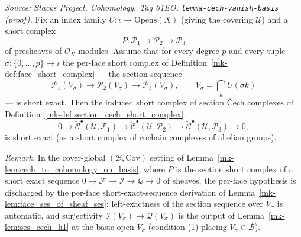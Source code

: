 \begin{lemma}\label{mk-lem:cech_ses_of_basis}
  \leanok

  \textit{Source: Stacks Project, Cohomology, Tag 01EO,
  \texttt{lemma-cech-vanish-basis} (proof).}
  Fix an index family \(U : \iota \to \mathrm{Opens}(X)\) (giving the covering \(\mathcal{U}\)) and a
  short complex
  \[
    P : \mathcal{P}_1 \to \mathcal{P}_2 \to \mathcal{P}_3
  \]
  of presheaves of \(\mathcal{O}_X\)-modules. Assume that for every degree \(p\) and every tuple
  \(\sigma : \{0, \ldots, p\} \to \iota\) the per-face short complex of
  Definition~\ref{mk-def:face_short_complex} — the section sequence
  \[
    \mathcal{P}_1(V_\sigma) \longrightarrow \mathcal{P}_2(V_\sigma) \longrightarrow
      \mathcal{P}_3(V_\sigma), \qquad V_\sigma = \bigcap_k U(\sigma k)
  \]
  — is short exact. Then the induced short complex of section {\v C}ech complexes of
  Definition~\ref{mk-def:section_cech_short_complex},
  \[
    0 \to \check{\mathcal{C}}^\bullet(\mathcal{U}, \mathcal{P}_1) \to
      \check{\mathcal{C}}^\bullet(\mathcal{U}, \mathcal{P}_2) \to
      \check{\mathcal{C}}^\bullet(\mathcal{U}, \mathcal{P}_3) \to 0,
  \]
  is short exact (as a short complex of cochain complexes of abelian groups).

  \emph{Remark.} In the cover-global \((\mathcal{B}, \mathrm{Cov})\) setting of
  Lemma~\ref{mk-lem:cech_to_cohomology_on_basis}, where \(P\) is the section short complex of a short
  exact sequence \(0 \to \mathcal{F} \to \mathcal{I} \to \mathcal{Q} \to 0\) of sheaves, the per-face
  hypothesis is discharged by the per-face short-exact-sequence derivation of
  Lemma~\ref{mk-lem:face_ses_of_sheaf_ses}: left-exactness of the section sequence over \(V_\sigma\) is
  automatic, and surjectivity \(\mathcal{I}(V_\sigma) \to \mathcal{Q}(V_\sigma)\) is the output of
  Lemma~\ref{mk-lem:ses_cech_h1} at the basic open \(V_\sigma\) (condition (1) placing \(V_\sigma \in
  \mathcal{B}\)).
\end{lemma}

